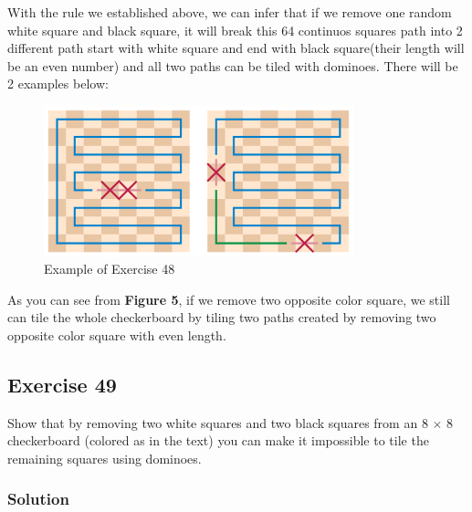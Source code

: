 \documentclass{article}
\begin{document}
With the rule we established above, we can infer that if we remove one random 
white square and black square, it will break this 64 continuos squares path into
2 different path start with white square and end with black square(their length will
be an even number) and all two paths can be tiled with dominoes. There will be
2 examples below:
\clearpage
\begin{figure}
    \begin{center}
        \includegraphics[width = 0.8\textwidth]{GomoryTheorem-01.png}
        \caption{Example of Exercise 48}
    \end{center}
\end{figure}
As you can see from \textbf{Figure 5}, if we remove two opposite color square,
we still can tile the whole checkerboard by tiling two paths created by 
removing two opposite color square with even length.
\subsection*{Exercise 49}
Show that by removing two white squares and two black squares from an 
8 \(\times\) 8 checkerboard (colored as in the text) you can make it 
impossible to tile the remaining squares using dominoes.
\subsubsection*{Solution}
\end{document}
